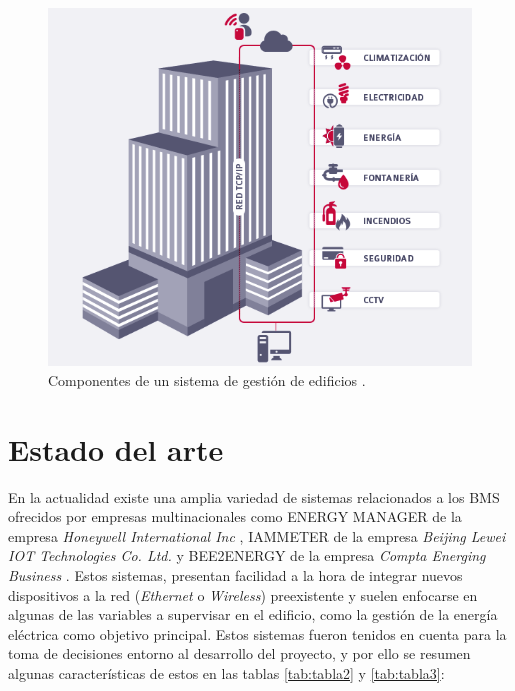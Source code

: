 \begin{figure}[htbp]
\centering
\includegraphics[width=.9\textwidth]{./Figures/bms2.png}
\caption{Componentes de un sistema de gestión de edificios \protect\footnotemark .}
\label{fig:bms}
\end{figure}


\section{Estado del arte}
En la actualidad existe una amplia variedad de sistemas relacionados a los BMS ofrecidos por empresas multinacionales como ENERGY MANAGER de la empresa \emph{Honeywell International Inc} \citep{WEBSITE:35}, IAMMETER de la empresa \emph{Beijing Lewei IOT Technologies Co. Ltd.} \citep{WEBSITE:36} y BEE2ENERGY de la empresa \emph{Compta Energing Business} \citep{WEBSITE:37}. Estos sistemas, presentan facilidad a la hora de integrar nuevos dispositivos a la red (\emph{Ethernet} o \emph{Wireless}) preexistente y suelen enfocarse en algunas de las variables a supervisar en el edificio, como la gestión de la energía eléctrica como objetivo principal. Estos sistemas fueron tenidos en cuenta para la toma de decisiones entorno al desarrollo del proyecto, y por ello se resumen algunas características de estos en las tablas \ref{tab:tabla2} y \ref{tab:tabla3}:



